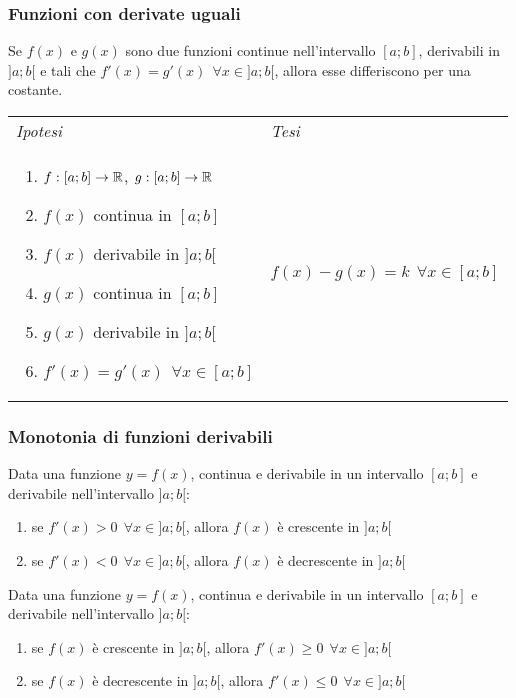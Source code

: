 \documentclass{article}     %
\begin{document}
        \subsubsection{Funzioni con derivate uguali}
            \begin{shadedTheorem}
                Se $f(x)$ e $g(x)$ sono due funzioni continue nell'intervallo $[a;b]$, derivabili in $]a;b[$ e tali che $f'(x)=g'(x)~~\forall x \in ]a;b[$, allora esse differiscono per una costante.
            \end{shadedTheorem}
            \begin{tabular}{m{}m{}}
            \textit{Ipotesi} & \textit{Tesi}\\
            \begin{enumerate}
                \item $f:[a;b] \to \mathbb{R}$, $g: [a;b] \to \mathbb{R}$
                \item $f(x)$ continua in $[a;b]$
                \item $f(x)$ derivabile in $]a;b[$
                \item $g(x)$ continua in $[a;b]$
                \item $g(x)$ derivabile in $]a;b[$
                \item $f'(x)=g'(x) ~~ \forall x \in [a;b]$
        \end{enumerate} & $f(x)-g(x) = k ~~ \forall x \in [a;b]$
           \end{tabular}
        \subsubsection{Monotonia di funzioni derivabili}
            \begin{shadedTheorem}
                Data una funzione $y=f(x)$, continua e derivabile in un intervallo $[a;b]$ e derivabile nell'intervallo $]a;b[$: \begin{enumerate}
                    \item se $f'(x)>0 ~~\forall x \in ]a;b[$, allora $f(x)$ è crescente in $]a;b[$
                    \item se $f'(x)<0 ~~\forall x \in ]a;b[$, allora $f(x)$ è decrescente in $]a;b[$
                \end{enumerate} 
            \end{shadedTheorem}
            \begin{shadedTheorem}
                Data una funzione $y=f(x)$, continua e derivabile in un intervallo $[a;b]$ e derivabile nell'intervallo $]a;b[$: \begin{enumerate}
                    \item se $f(x)$ è crescente in $]a;b[$, allora $f'(x)\geq0 ~~\forall x \in ]a;b[$
                    \item se $f(x)$ è decrescente in $]a;b[$, allora $f'(x)\leq0 ~~\forall x \in ]a;b[$
                \end{enumerate} 
            \end{shadedTheorem}
\end{document}
